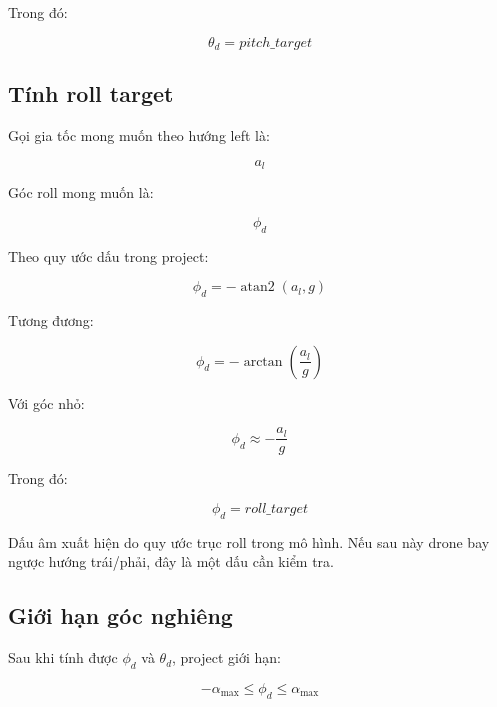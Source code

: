 Trong đó:

\begin{equation}
    \theta_d = pitch\_target
\end{equation}

\subsection{Tính roll target}

Gọi gia tốc mong muốn theo hướng left là:

\begin{equation}
    a_l
\end{equation}

Góc roll mong muốn là:

\begin{equation}
    \phi_d
\end{equation}

Theo quy ước dấu trong project:

\begin{equation}
    \phi_d
    =
    -\operatorname{atan2}(a_l, g)
\end{equation}

Tương đương:

\begin{equation}
    \phi_d
    =
    -\arctan\left(\frac{a_l}{g}\right)
\end{equation}

Với góc nhỏ:

\begin{equation}
    \phi_d \approx -\frac{a_l}{g}
\end{equation}

Trong đó:

\begin{equation}
    \phi_d = roll\_target
\end{equation}

Dấu âm xuất hiện do quy ước trục roll trong mô hình.
Nếu sau này drone bay ngược hướng trái/phải, đây là một dấu cần kiểm tra.

\subsection{Giới hạn góc nghiêng}

Sau khi tính được $\phi_d$ và $\theta_d$, project giới hạn:

\begin{equation}
    -\alpha_{\max}
    \leq
    \phi_d
    \leq
    \alpha_{\max}
\end{equation}

